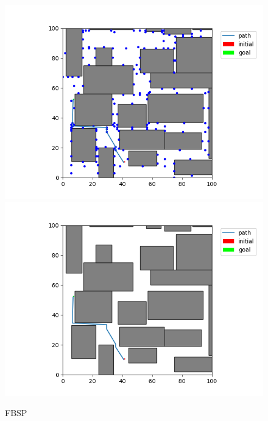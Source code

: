 \documentclass[12pt,a4paper]{article}
\begin{document}
\begin{figure}[H]
\centering
	\includegraphics[scale=.40]{20_50_fbsp_state}
    \includegraphics[scale=.40]{20_50_fbsp_path}
\caption{FBSP}
\end{figure}

\newpage
\end{document}
